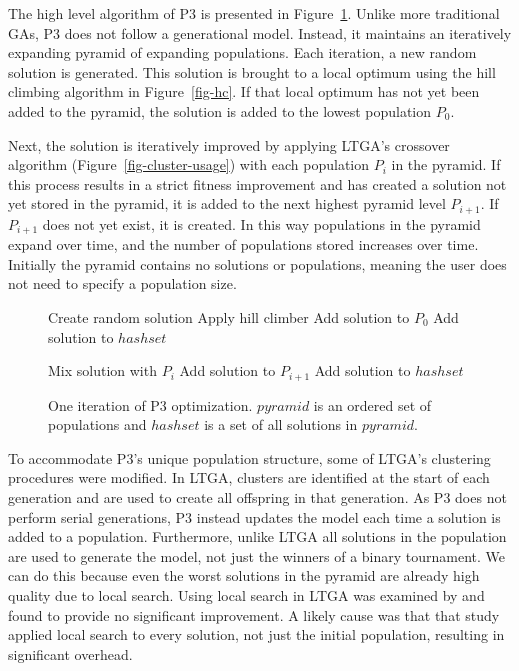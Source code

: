 \documentclass[twoside]{article}
\begin{document}
The high level algorithm of P3 is presented in Figure~\ref{fig-p3}. Unlike more traditional
GAs, P3 does not follow a generational model. Instead, it maintains an iteratively
expanding pyramid of expanding populations. Each iteration, a new random solution is generated.
This solution is brought to a local optimum using the hill climbing algorithm in Figure~\ref{fig-hc}. If that
local optimum has not yet been added to the pyramid, the solution is added to the lowest
population $P_0$.

Next, the solution is iteratively improved by applying LTGA's crossover algorithm (Figure~\ref{fig-cluster-usage})
with each population $P_i$ in the pyramid. If this process results in a strict fitness improvement and has
created a solution not yet stored in the pyramid, it is added to the next highest pyramid level $P_{i+1}$.
If $P_{i+1}$ does not yet exist, it is created. In this way populations in the pyramid expand over time,
and the number of populations stored increases over time. Initially the pyramid contains no solutions
or populations, meaning the user does not need to specify a population size.


\begin{figure}
  \begin{algorithmic}[1]
    \State Create random solution
    \State Apply hill climber
      \State Add solution to $P_0$
      \State Add solution to $hashset$
    \EndIf

      \State Mix solution with $P_i$
          \State Add solution to $P_{i+1}$
          \State Add solution to $hashset$
        \EndIf
      \EndIf
    \EndFor
  \EndProcedure
\end{algorithmic}
  \caption{One iteration of P3 optimization. $pyramid$ is an
           ordered set of populations and $hashset$ is a set
           of all solutions in $pyramid$.}
  \label{fig-p3}
\end{figure}

To accommodate P3's unique population structure, some of LTGA's clustering procedures were modified. In LTGA,
clusters are identified at the start of each generation and are used
to create all offspring in that generation. As P3 does not perform serial
generations, P3 instead updates the model each
time a solution is added to a population. Furthermore, unlike
LTGA all solutions in the population are used to generate the model, not just the
winners of a binary tournament. We can do this because even the
worst solutions in the pyramid are already high quality due to local search.
Using local search in LTGA was examined by \cite{bosman:2011:lsbbo} and found
to provide no significant improvement. A likely cause was that that study applied
local search to every solution, not just the initial population, resulting in significant overhead.
\end{document}
